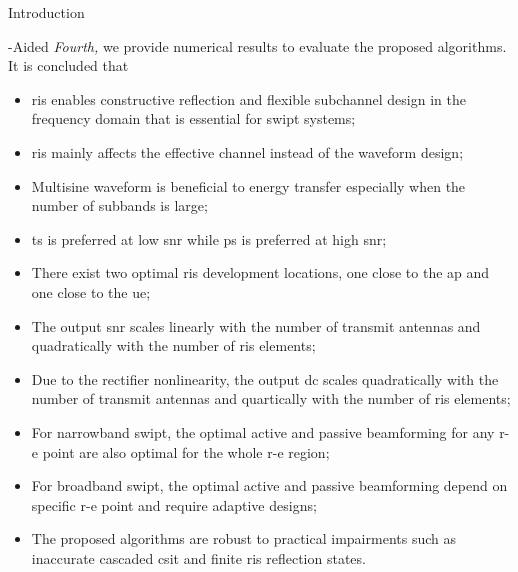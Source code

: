 \begin{section}{Introduction}
\begin{subsection}{-Aided }
		\emph{Fourth,} we provide numerical results to evaluate the proposed algorithms. It is concluded that
		\begin{itemize}
			\item \gls{ris} enables constructive reflection and flexible subchannel design in the frequency domain that is essential for \gls{swipt} systems;
			\item \gls{ris} mainly affects the effective channel instead of the waveform design;
			\item Multisine waveform is beneficial to energy transfer especially when the number of subbands is large;
			\item \gls{ts} is preferred at low \gls{snr} while \gls{ps} is preferred at high \gls{snr};
			\item There exist two optimal \gls{ris} development locations, one close to the \gls{ap} and one close to the \gls{ue};
			\item The output \gls{snr} scales linearly with the number of transmit antennas and quadratically with the number of \gls{ris} elements;
			\item Due to the rectifier nonlinearity, the output \gls{dc} scales quadratically with the number of transmit antennas and quartically with the number of \gls{ris} elements;
			\item For narrowband \gls{swipt}, the optimal active and passive beamforming for any \gls{r-e} point are also optimal for the whole \gls{r-e} region;
			\item For broadband \gls{swipt}, the optimal active and passive beamforming depend on specific \gls{r-e} point and require adaptive designs;
			\item The proposed algorithms are robust to practical impairments such as inaccurate cascaded \gls{csit} and finite \gls{ris} reflection states.
		\end{itemize}
	\end{subsection}
\end{section}

